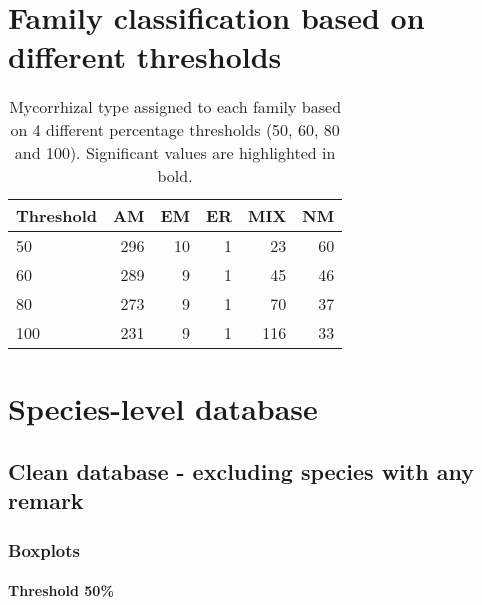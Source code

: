 \documentclass[]{article}
\let\oldparagraph\paragraph
\renewcommand{\paragraph}[1]{\oldparagraph{#1}\mbox{}}
\begin{document}
\hypertarget{family-classification-based-on-different-thresholds}{%
\section{Family classification based on different
thresholds}\label{family-classification-based-on-different-thresholds}}

\begin{table}[H]

\caption{\label{tab:unnamed-chunk-23}Mycorrhizal type assigned to each family based on 4 different percentage thresholds (50, 60, 80 and 100). Significant values are highlighted in bold.}
\centering
\begin{tabular}{l|r|r|r|r|r}
\hline
Threshold & AM & EM & ER & MIX & NM\\
\hline
50 & 296 & 10 & 1 & 23 & 60\\
\hline
60 & 289 & 9 & 1 & 45 & 46\\
\hline
80 & 273 & 9 & 1 & 70 & 37\\
\hline
100 & 231 & 9 & 1 & 116 & 33\\
\hline
\end{tabular}
\end{table}

\pagebreak

\hypertarget{species-level-database}{%
\section{Species-level database}\label{species-level-database}}

\hypertarget{clean-database---excluding-species-with-any-remark}{%
\subsection{Clean database - excluding species with any
remark}\label{clean-database---excluding-species-with-any-remark}}

\hypertarget{boxplots-2}{%
\subsubsection{Boxplots}\label{boxplots-2}}

\hypertarget{threshold-50-2}{%
\paragraph{Threshold 50\%}\label{threshold-50-2}}
\end{document}
